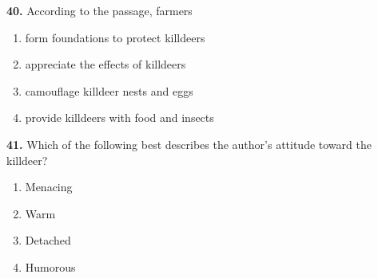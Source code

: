 \documentclass[12pt]{article}
\begin{document}
\par
\vspace{0.25\baselineskip}
\noindent\textbf{40.} According to the passage, farmers
\begin{enumerate}[label=(\Alph*),leftmargin=*,itemsep=0.2em]
\item form foundations to protect killdeers
\item appreciate the effects of killdeers
\item camouflage killdeer nests and eggs
\item provide killdeers with food and insects
\end{enumerate}
\par
\vspace{0.25\baselineskip}
\noindent\textbf{41.} Which of the following best describes the author's attitude toward the killdeer?
\begin{enumerate}[label=(\Alph*),leftmargin=*,itemsep=0.2em]
\item Menacing
\item Warm
\item Detached
\item Humorous
\end{enumerate}
\par
\vspace{0.25\baselineskip}
\end{document}
